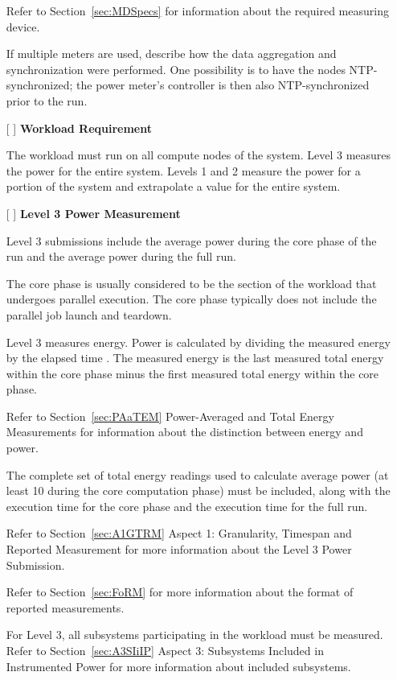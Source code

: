 \begin{itemize}
Refer to Section~\ref{sec:MDSpecs} for information about the required measuring device.

If multiple meters are used, describe how the data aggregation and synchronization were performed. One possibility is to have the nodes NTP-synchronized; the power meter's controller is then also NTP-synchronized prior to the run.

\item[{[ ]}]
\textbf{Workload Requirement}

The workload must run on all compute nodes of the system. Level 3 measures the power for the entire system. Levels 1 and 2 measure the power for a portion of the system and extrapolate a value for the entire system. 

\item[{[ ]}]
\textbf{Level 3 Power Measurement}

Level 3 submissions include the average power during the core phase of the run and the average power during the full run.

The core phase is usually considered to be the section of the workload that undergoes parallel execution. The core phase typically does not include the parallel job launch and teardown.

Level 3 measures energy. Power is calculated by dividing the measured energy by the elapsed time . The measured energy is the last measured total energy within the core phase minus the first measured total energy within the core phase.

Refer to Section~\ref{sec:PAaTEM} Power-Averaged and Total Energy Measurements for information about the distinction between energy and power.

The complete set of total energy readings used to calculate average power (at least 10 during the core computation phase) must be included, along with the execution time for the core phase and the execution time for the full run.

Refer to Section~\ref{sec:A1GTRM} Aspect 1: Granularity, Timespan and Reported Measurement for more 
information about the Level 3 Power Submission.

Refer to Section~\ref{sec:FoRM} for more information about the format of reported measurements.

For Level 3, all subsystems participating in the workload must be measured. Refer to 
Section~\ref{sec:A3SIiIP} Aspect 3: Subsystems Included in Instrumented Power for more information about included subsystems.


\end{itemize}
